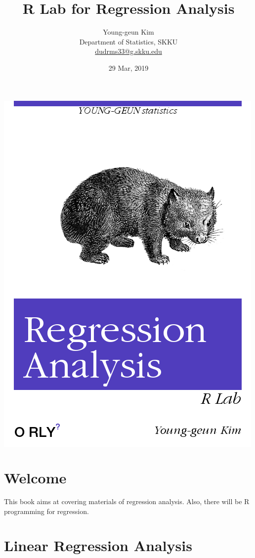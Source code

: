 \documentclass[]{book}
\title{R Lab for Regression Analysis}
\author{Young-geun Kim\\
Department of Statistics, SKKU\\
\href{mailto: dudrms33@g.skku.edu}{dudrms33@g.skku.edu}}
\date{29 Mar, 2019}
\theoremstyle{definition}
\theoremstyle{definition}
\theoremstyle{definition}
\theoremstyle{remark}
\begin{document}
\maketitle

\includegraphics{cover}
\cleardoublepage
\frontmatter

{
\setcounter{tocdepth}{1}
\tableofcontents
}
\hypertarget{welcome}{%
\chapter*{Welcome}\label{welcome}}

This book aims at covering materials of regression analysis. Also, there will be R programming for regression.

\hypertarget{linear-regression-analysis}{%
\chapter{Linear Regression Analysis}\label{linear-regression-analysis}}
\end{document}

